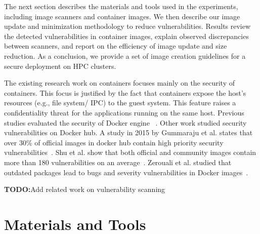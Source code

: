 \documentclass[a4paper,num-refs]{oup-contemporary}
\newcommand{\todo}[1]{\color{red}\textbf{TODO:}#1\color{black}}
\begin{document}
The next section describes the materials and tools used in the experiments,
including image scanners and container images. We then describe our image
update and minimization methodology to reduce vulnerabilities. Results review
the detected vulnerabilities in container images, explain observed
discrepancies between scanners, and report on the efficiency of image
update and size reduction. As a conclusion, we provide a set of image
creation guidelines for a secure deployment on HPC clusters.


The existing research work on containers focuses mainly on the security of containers.
This focus is justified by the fact that containers expose the host's resources
(e.g., file system/ IPC) to the guest system. This feature raises a confidentiality
threat for the applications running on the same host. Previous studies evaluated
the security of Docker engine ~\cite{martin2018docker, sultan2019container, combe2016docker, bui2015analysis}.
Other work studied security vulnerabilities on Docker hub. A study in 2015 by Gummaraju et al.
states that over 30\% of official images in docker hub contain high priority 
security vulnerabilities~\cite{gummaraju2015over}. Shu et al. show that both official and community images 
contain more than 180 vulnerabilities on an average~\cite{Shu2017}.
Zerouali et al. studied that 
outdated packages lead to bugs and severity vulnerabilities in Docker
images~\cite{zerouali2019relation}.

\todo{Add related work on vulnerability scanning}

\section{Materials and Tools}
\end{document}
